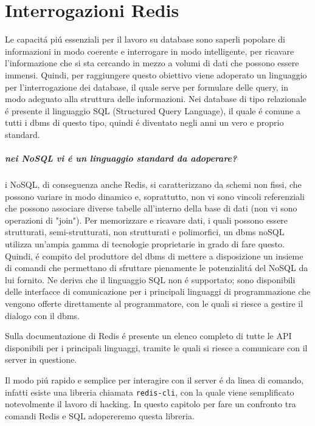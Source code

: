 \chapter{Interrogazioni Redis}
Le capacitá piú essenziali per il lavoro su database sono saperli popolare di informazioni in modo coerente e interrogare in modo
intelligente, per ricavare l'informazione che si sta cercando in mezzo a volumi di dati che possono essere immensi.
Quindi, per raggiungere questo obiettivo viene adoperato un linguaggio per l'interrogazione dei database, il quale serve per formulare delle
query, in modo adeguato alla struttura delle informazioni.
Nei database di tipo relazionale é presente il linguaggio SQL (Structured Query Language), il quale é comune a tutti i dbms di questo tipo, quindi
é diventato negli anni un vero e proprio standard.

\paragraph{nei NoSQL vi é un linguaggio standard da adoperare?\\}
i NoSQL, di conseguenza anche Redis, si caratterizzano da schemi non fissi, che possono variare in modo dinamico e, soprattutto, non vi sono vincoli referenziali che possono associare
diverse tabelle all'interno della base di dati (non vi sono operazioni di "join").
Per memorizzare e ricavare dati, i quali possono essere strutturati, semi-strutturati, non strutturati e polimorfici, un dbms noSQL utilizza un'ampia gamma di
tecnologie proprietarie in grado di fare questo.
Quindi, é compito del produttore del dbms di mettere a disposizione un insieme di comandi che permettano di sfruttare pienamente le potenzialitá del NoSQL da lui fornito.
Ne deriva che il linguaggio SQL non é supportato;
sono disponibili delle interfacce di comunicazione per i principali linguaggi di programmazione che vengono
offerte direttamente al programmatore, con le quali si riesce a gestire il dialogo con il dbms.

Sulla documentazione di Redis é presente un elenco completo di tutte le API disponibili per i principali linguaggi, tramite le quali si riesce a comunicare con il server in questione.

Il modo piú rapido e semplice per interagire con il server é da linea di comando, infatti esiste una libreria chiamata
\texttt{redis-cli}, con la quale viene semplificato notevolmente il lavoro di hacking.
In questo capitolo per fare un confronto tra comandi Redis e SQL adopereremo questa libreria.\\

